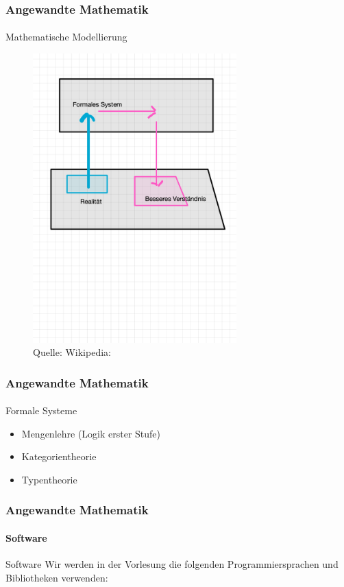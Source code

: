 \documentclass{beamer}
\begin{document}
\begin{frame}
    \frametitle{Angewandte Mathematik}
\framesubtitle{}
    \begin{block}{Mathematische Modellierung}
\begin{figure}[H]
      \centering
    \includegraphics[width=0.7\textwidth]{images/modellierung}
      \caption{Quelle: Wikipedia: }
\end{figure}
\end{block}
 \end{frame}


 \begin{frame}
    \frametitle{Angewandte Mathematik}
\framesubtitle{}
    \begin{block}{Formale Systeme}
\begin{itemize}
\item Mengenlehre (Logik erster Stufe)
\item Kategorientheorie
\item Typentheorie
\end{itemize}
\end{block}
 \end{frame}


 \begin{frame}
    \frametitle{Angewandte Mathematik}
\framesubtitle{Software}
    \begin{block}{Software}
        Wir werden in der Vorlesung die folgenden Programmiersprachen und Bibliotheken verwenden:

    \end{block}
 \end{frame}
\end{document}
